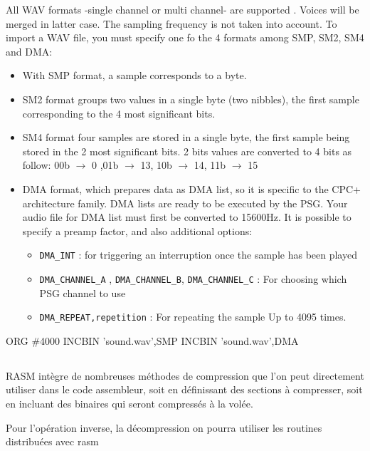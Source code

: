 
\begin{xen}

All WAV formats -single channel or multi channel- are supported . Voices will be merged in latter case. The sampling frequency is not taken into account.  To import a WAV file, you must specify one fo the 4 formats among SMP, SM2, SM4 and DMA:
\begin{itemize}
\item With SMP format, a sample corresponds to a byte.
\item SM2 format groups two values in a single byte (two nibbles), the first sample corresponding to the 4 most significant bits.
\item SM4 format four samples are stored in a single byte, the first sample being stored in the 2 most significant bits. 2 bits values are converted to 4 bits as follow: 00b $\rightarrow$ 0 ,01b $\rightarrow$ 13, 10b $\rightarrow$ 14, 11b $\rightarrow$ 15
\item DMA format, which prepares data as DMA list, so it is specific to the CPC+ architecture family. DMA lists are ready to be executed by the PSG. Your audio file for DMA list must first be converted to 15600Hz.
It is possible to specify a preamp factor, and also additional options:
  \begin{itemize}
    \item \texttt{DMA\_INT} : for triggering an interruption once the sample has been played
    \item \texttt{DMA\_CHANNEL\_A} , \texttt{DMA\_CHANNEL\_B}, \texttt{DMA\_CHANNEL\_C} : For choosing which PSG channel to use
    \item \texttt{DMA\_REPEAT,repetition} : For repeating the sample Up to 4095 times.
  \end{itemize}
\end{itemize}

\end{xen}

\begin{code}
ORG \#4000
INCBIN 'sound.wav',SMP
INCBIN 'sound.wav',DMA
\end{code}

\subsection{}

\begin{xfr}
RASM intègre de nombreuses méthodes de compression que l'on peut directement utiliser dans le code assembleur, soit en définissant des sections à compresser, soit en incluant des binaires qui seront compressés à la volée.

Pour l'opération inverse, la décompression on pourra utiliser les routines distribuées avec rasm
\end{xfr}

